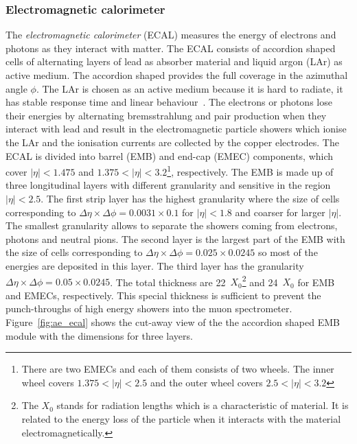 
\subsubsection{Electromagnetic calorimeter}
\label{subsubsec:ae_ecal}
The \textit{electromagnetic calorimeter} (ECAL) measures the energy of electrons and photons as they interact with matter.
The ECAL consists of accordion shaped cells of alternating layers of lead as absorber material and liquid argon (LAr) as active medium.
The accordion shaped provides the full coverage in the azimuthal angle $\phi$.
The LAr is chosen as an active medium because it is hard to radiate, it has stable response time and linear behaviour~\cite{1748-0221-3-08-S08003}.
The electrons or photons lose their energies by alternating bremsstrahlung and pair production when they interact with lead and result in the electromagnetic particle showers which ionise the LAr and the ionisation currents are collected by the copper electrodes.
The ECAL is divided into barrel (EMB) and end-cap (EMEC) components, which cover $|\eta| < 1.475$ and $1.375 < |\eta| < 3.2$\footnote{There are two EMECs and each of them consists of two wheels. The inner wheel covers $1.375 < |\eta| < 2.5$ and the outer wheel covers $2.5 < |\eta| < 3.2$}, respectively.
The EMB is made up of three longitudinal layers with different granularity and sensitive in the region $|\eta| < 2.5$.
The first strip layer has the highest granularity where the size of cells corresponding to $\Delta \eta \times \Delta \phi = 0.0031 \times 0.1$ for $|\eta| < 1.8$ and coarser for larger $|\eta|$.
The smallest granularity allows to separate the showers coming from electrons, photons and neutral pions.
The second layer is the largest part of the EMB with the size of cells corresponding to $\Delta \eta \times \Delta \phi = 0.025 \times 0.0245$ so most of the energies are deposited in this layer.
The third layer has the granularity $\Delta \eta \times \Delta \phi = 0.05 \times 0.0245$.
The total thickness are 22~$X_{0}$\footnote{The $X_{0}$ stands for radiation lengths which is a characteristic of material. It is related to the energy loss of the particle when it interacts with the material electromagnetically.} and 24~$X_{0}$ for EMB and EMECs, respectively.
This special thickness is sufficient to prevent the punch-throughs of high energy showers into the muon spectrometer.
Figure~\ref{fig:ae_ecal} shows the cut-away view of the the accordion shaped EMB module with the dimensions for three layers.

